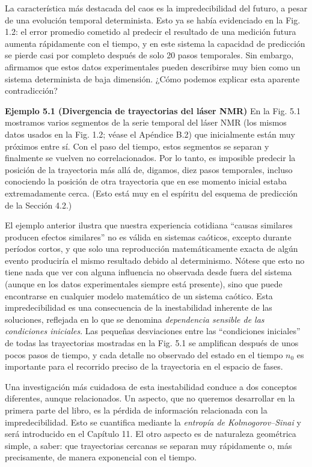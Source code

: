 \documentclass[10pt,a4paper]{book}
\begin{document}
La característica más destacada del caos es la impredecibilidad del futuro, a pesar de una evolución temporal determinista. Esto ya se había evidenciado en la Fig. 1.2: el error promedio cometido al predecir el resultado de una medición futura aumenta rápidamente con el tiempo, y en este sistema la capacidad de predicción se pierde casi por completo después de solo 20 pasos temporales. Sin embargo, afirmamos que estos datos experimentales pueden describirse muy bien como un sistema determinista de baja dimensión. ¿Cómo podemos explicar esta aparente contradicción?

\bigskip

\textbf{Ejemplo 5.1 (Divergencia de trayectorias del láser NMR)} En la Fig. 5.1 mostramos varios segmentos de la serie temporal del láser NMR (los mismos datos usados en la Fig. 1.2; véase el Apéndice B.2) que inicialmente están muy próximos entre sí. Con el paso del tiempo, estos segmentos se separan y finalmente se vuelven no correlacionados. Por lo tanto, es imposible predecir la posición de la trayectoria más allá de, digamos, diez pasos temporales, incluso conociendo la posición de otra trayectoria que en ese momento inicial estaba extremadamente cerca. (Esto está muy en el espíritu del esquema de predicción de la Sección 4.2.)

\bigskip

El ejemplo anterior ilustra que nuestra experiencia cotidiana “causas similares producen efectos similares” no es válida en sistemas caóticos, excepto durante períodos cortos, y que solo una reproducción matemáticamente exacta de algún evento produciría el mismo resultado debido al determinismo. Nótese que esto no tiene nada que ver con alguna influencia no observada desde fuera del sistema (aunque en los datos experimentales siempre está presente), sino que puede encontrarse en cualquier modelo matemático de un sistema caótico. Esta impredecibilidad es una consecuencia de la inestabilidad inherente de las soluciones, reflejada en lo que se denomina \textit{dependencia sensible de las condiciones iniciales}. Las pequeñas desviaciones entre las “condiciones iniciales” de todas las trayectorias mostradas en la Fig. 5.1 se amplifican después de unos pocos pasos de tiempo, y cada detalle no observado del estado en el tiempo $n_0$ es importante para el recorrido preciso de la trayectoria en el espacio de fases.

\bigskip

Una investigación más cuidadosa de esta inestabilidad conduce a dos conceptos diferentes, aunque relacionados. Un aspecto, que no queremos desarrollar en la primera parte del libro, es la pérdida de información relacionada con la impredecibilidad. Esto se cuantifica mediante la \textit{entropía de Kolmogorov–Sinai} y será introducido en el Capítulo 11. El otro aspecto es de naturaleza geométrica simple, a saber: que trayectorias cercanas se separan muy rápidamente o, más precisamente, de manera exponencial con el tiempo.
\end{document}
